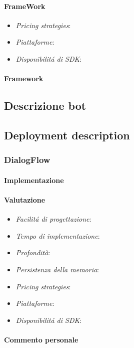 \documentclass[]{article}
\begin{document}
\paragraph{FrameWork}
\begin{itemize}
\item \textit{Pricing strategies}: 
\item \textit{Piattaforme}: 
\item \textit{Disponibilitá di SDK}: 
\end{itemize}

\paragraph{Framework}
\subsection{Descrizione bot}
\subsection{Deployment description}

\subsubsection{DialogFlow}
\paragraph{Implementazione}
\paragraph{Valutazione}
\begin{itemize}
\item \textit{Facilitá di progettazione}: 
\item \textit{Tempo di implementazione}: 
\item \textit{Profondità}: 
\item \textit{Persistenza della memoria}: 
\item \textit{Pricing strategies}: 
\item \textit{Piattaforme}: 
\item \textit{Disponibilitá di SDK}: 
\end{itemize}
\paragraph{Commento personale}
\end{document}
